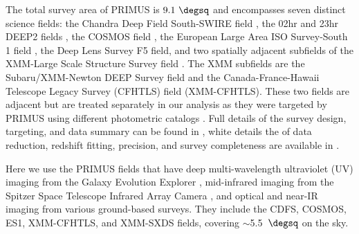 The total survey area of PRIMUS is $9.1~\degsq$ and encompasses seven distinct science fields:
the Chandra Deep Field South-SWIRE field \citep[CDFS;][]{Lonsdale03},
the 02hr and 23hr DEEP2 fields \citep{Newman13},
the COSMOS field \citep{Scoville07},
the European Large Area ISO Survey-South 1 field \citep[ES1;][]{Oliver00},
the Deep Lens Survey \citep[DLS;][]{Wittman02} F5 field,
and two spatially adjacent subfields of the XMM-Large Scale Structure Survey field \citep[XMM-LSS;][]{Pierre04}.
The XMM subfields are the Subaru/XMM-Newton DEEP Survey field \citep[XMM-SXDS;][]{Furusawa08} and the Canada-France-Hawaii 
Telescope Legacy 
Survey (CFHTLS) field (XMM-CFHTLS).
These two fields are adjacent but are treated separately in our analysis 
as they were targeted by PRIMUS using different photometric catalogs \citep[see][for details]{Coil11}.
Full details of the survey design, targeting, and data summary can be found in \citet{Coil11}, white details the of data reduction, redshift 
fitting, precision, 
and survey completeness are available in \citet{Cool13}.

Here we use the PRIMUS fields that have deep multi-wavelength ultraviolet (UV) imaging from the Galaxy Evolution Explorer 
\citep[GALEX;][]{Martin05}, 
mid-infrared imaging from the Spitzer Space Telescope \citep{Werner04} Infrared Array Camera \citep[IRAC;][]{Fazio04}, and optical and 
near-IR imaging 
from various ground-based surveys.
They include the CDFS, COSMOS, ES1, XMM-CFHTLS, and XMM-SXDS fields, covering {$\sim$5.5~$\degsq$} on the sky.

